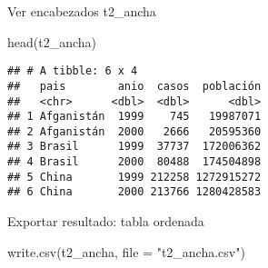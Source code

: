 \documentclass[
]{article}
\newenvironment{Shaded}{\begin{snugshade}}{\end{snugshade}}
\newcommand{\AttributeTok}[1]{\textcolor[rgb]{0.77,0.63,0.00}{#1}}
\newcommand{\FunctionTok}[1]{\textcolor[rgb]{0.00,0.00,0.00}{#1}}
\newcommand{\NormalTok}[1]{#1}
\newcommand{\StringTok}[1]{\textcolor[rgb]{0.31,0.60,0.02}{#1}}
\begin{document}
Ver encabezados t2\_ancha

\begin{Shaded}
\begin{Highlighting}[]
\FunctionTok{head}\NormalTok{(t2\_ancha)}
\end{Highlighting}
\end{Shaded}

\begin{verbatim}
## # A tibble: 6 x 4
##   pais        anio  casos  población
##   <chr>      <dbl>  <dbl>      <dbl>
## 1 Afganistán  1999    745   19987071
## 2 Afganistán  2000   2666   20595360
## 3 Brasil      1999  37737  172006362
## 4 Brasil      2000  80488  174504898
## 5 China       1999 212258 1272915272
## 6 China       2000 213766 1280428583
\end{verbatim}

Exportar resultado: tabla ordenada

\begin{Shaded}
\begin{Highlighting}[]
\FunctionTok{write.csv}\NormalTok{(t2\_ancha, }\AttributeTok{file =} \StringTok{"t2\_ancha.csv"}\NormalTok{)}
\end{Highlighting}
\end{Shaded}
\end{document}
